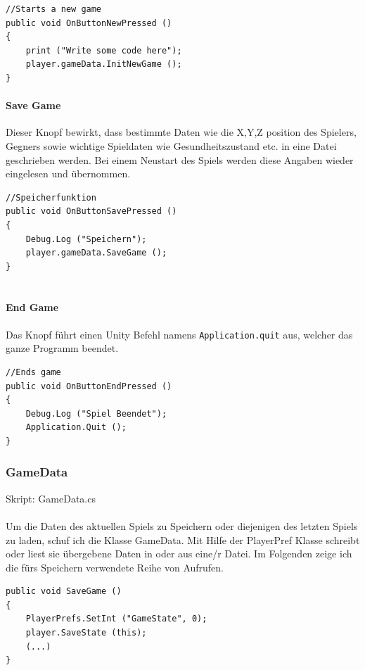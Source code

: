\begin{lstlisting}[caption={New Game}]
//Starts a new game
public void OnButtonNewPressed ()
{
	print ("Write some code here");
	player.gameData.InitNewGame ();
}

\end{lstlisting}

\paragraph{Save Game}
Dieser Knopf bewirkt, dass bestimmte Daten wie die X,Y,Z position des Spielers, Gegners sowie wichtige Spieldaten wie Gesundheitszustand etc. in eine Datei geschrieben werden. Bei einem Neustart des Spiels werden diese Angaben wieder eingelesen und übernommen.

\begin{lstlisting}[caption={Save Game}]
//Speicherfunktion
public void OnButtonSavePressed ()
{
	Debug.Log ("Speichern");
	player.gameData.SaveGame ();
}
	
\end{lstlisting}

\paragraph{End Game}
Das Knopf führt einen Unity Befehl namens \lstinline{Application.quit}  aus, welcher das ganze Programm beendet. 

\begin{lstlisting}[caption={End Game}]
//Ends game
public void OnButtonEndPressed ()
{
	Debug.Log ("Spiel Beendet");
	Application.Quit ();
}
\end{lstlisting}

\subsubsection{GameData}
Skript: GameData.cs\\\\
Um die Daten des aktuellen Spiels zu Speichern oder diejenigen des letzten Spiels zu laden, schuf ich die Klasse GameData.
Mit Hilfe der PlayerPref Klasse schreibt oder liest sie übergebene Daten in oder aus eine/r Datei. 
Im Folgenden zeige ich die fürs Speichern verwendete Reihe von Aufrufen.
\begin{lstlisting}[caption={Methode zur Speicherung des Spielstandes in GameData}]
public void SaveGame ()
{
	PlayerPrefs.SetInt ("GameState", 0);
	player.SaveState (this);
	(...)
}
\end{lstlisting}


